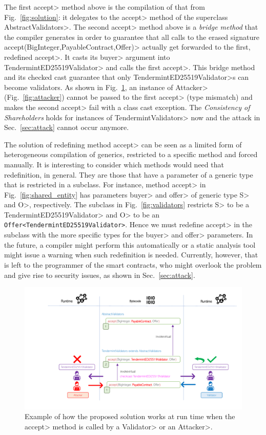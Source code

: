 \noindent
The first \<accept> method above is the compilation of that from Fig.~\ref{fig:solution}:
it delegates to the \<accept> method of the superclass \<AbstractValidators>. The second
\<accept> method above is a \emph{bridge method} that the compiler generates in order to guarantee
that all calls to the erased signature \<accept(BigInteger,PayableContract,Offer)> actually
get forwarded to the first, redefined \<accept>. It casts its \<buyer> argument
into \<TendermintED25519Validator> and calls the first \<accept>. This
bridge method and its checked cast guarantee that only \<TendermintED25519Validator>s
can become validators. As shown in Fig.~\ref{figure.solution},
an instance of \<Attacker> (Fig.~\ref{fig:attacker})
cannot be passed to the first \<accept> (type mismatch) and makes the second \<accept>
fail with a class cast exception. The \emph{Consistency of Shareholders} holds
for instances of \<TendermintValidators> now and the attack in Sec.~\ref{sec:attack} cannot occur
anymore.

The solution of redefining method \<accept> can be seen as a limited form of heterogeneous
compilation of generics, restricted to a specific method and forced manually.
It is interesting to consider which methods
would need that redefinition, in general. They are those that have a parameter of a generic type
that is restricted in a subclass. For instance, method \<accept> in
Fig.~\ref{fig:shared_entity} has parameters \<buyer> and \<offer> of generic type
\<S> and \<O>, respectively. The subclass in Fig.~\ref{fig:validators} restricts
\<S> to be a \<TendermintED25519Validator> and \<O> to be
an {\codesize\texttt{Offer<TendermintED25519Validator>}}. Hence we must redefine
\<accept> in the subclass with the more specific types for the \<buyer> and \<offer>
parameters. In the future, a compiler might perform this automatically or a static analysis
tool might issue a warning when such redefinition is needed. Currently, however, that is
left to the programmer of the smart contracts, who might overlook the problem
and give rise to security issues, as shown in Sec.~\ref{sec:attack}.

\begin{figure}[ht]
\centering
\includegraphics[width=0.9\linewidth]{figures/solution}
\caption{Example of how the proposed solution works at run time when the \<accept> method is called by a \<Validator> or an \<Attacker>.}
\label{figure.solution}
\end{figure}

